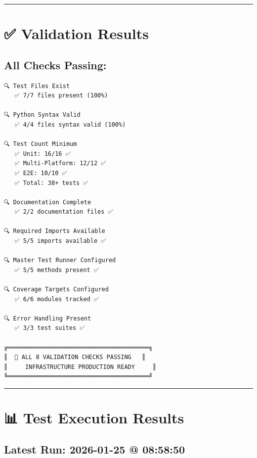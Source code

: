\documentclass[
  11pt,
  oneside,
  openany]{scrbook}
\begin{document}
\begin{center}\rule{0.5\linewidth}{0.5pt}\end{center}

\section{✅ Validation Results}\label{validation-results}

\subsection{All Checks Passing:}\label{all-checks-passing}

\begin{verbatim}
🔍 Test Files Exist
   ✅ 7/7 files present (100%)

🔍 Python Syntax Valid
   ✅ 4/4 files syntax valid (100%)

🔍 Test Count Minimum
   ✅ Unit: 16/16 ✅
   ✅ Multi-Platform: 12/12 ✅
   ✅ E2E: 10/10 ✅
   ✅ Total: 38+ tests ✅

🔍 Documentation Complete
   ✅ 2/2 documentation files ✅

🔍 Required Imports Available
   ✅ 5/5 imports available ✅

🔍 Master Test Runner Configured
   ✅ 5/5 methods present ✅

🔍 Coverage Targets Configured
   ✅ 6/6 modules tracked ✅

🔍 Error Handling Present
   ✅ 3/3 test suites ✅

╔════════════════════════════════════════╗
║  🎉 ALL 8 VALIDATION CHECKS PASSING   ║
║     INFRASTRUCTURE PRODUCTION READY     ║
╚════════════════════════════════════════╝
\end{verbatim}

\begin{center}\rule{0.5\linewidth}{0.5pt}\end{center}

\section{📊 Test Execution Results}\label{test-execution-results}

\subsection{Latest Run: 2026-01-25 @
08:58:50}\label{latest-run-2026-01-25-085850}
\end{document}
